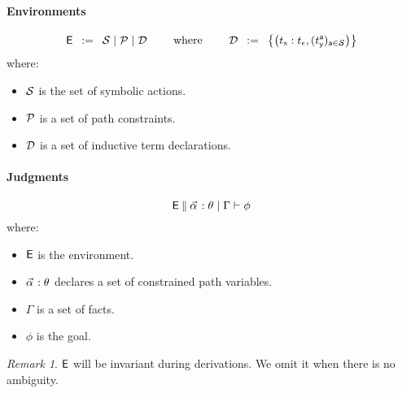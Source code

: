 \documentclass[a4paper]{article}
\theoremstyle{remark}
\newtheorem{remark}{Remark}
\begin{document}
\paragraph{Environments}
\[
  \textsf{E} \;\;\mathbin{:=}\;\;
  \mathcal{S} \mid
  \mathcal{P} \mid
  \mathcal{D}
  \qquad
  \text{ where }
  \qquad
  \mathcal{D} \;\;\mathbin{:=}\;\;
  \left\{
    \left(t_{\textsf{x}} : t_\epsilon,(t_{\textsf{y}}^{\textsf{a}})_{{\textsf{a}} \in \mathcal{S}}\right)
  \right\}
\]
where:
\begin{itemize}
\item $\mathcal{S}$ is the set of symbolic actions.
\item $\mathcal{P}$ is a set of path constraints.
\item $\mathcal{D}$ is a set of inductive term declarations.
\end{itemize}
\paragraph{Judgments}
\[
  \ejudge{\env}{\facts{\valpha}{\theta}{\Gamma}}{\phi}
\]
where:
\begin{itemize}
\item $\textsf{E}$ is the environment.
\item $\pvtype{\valpha}{\theta}$ declares a set of constrained path variables.
\item $\Gamma$ is a set of facts.
\item $\phi$ is the goal.
\end{itemize}

\begin{remark}
  $\textsf{E}$ will be invariant during derivations. We omit it when there is no ambiguity.
\end{remark}
\end{document}
